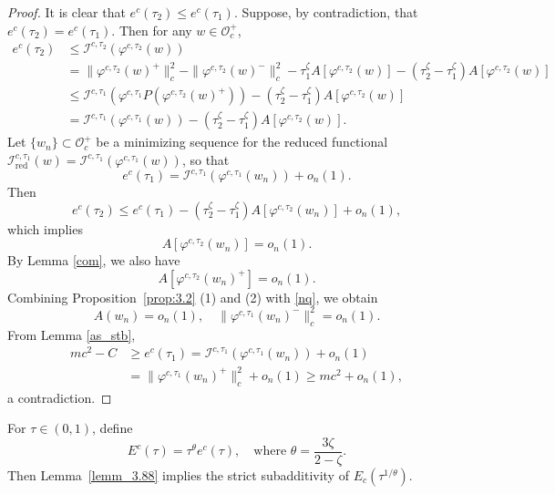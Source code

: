 \documentclass{amsart}
\theoremstyle{plain}
\theoremstyle{definition}
\theoremstyle{remark}
\numberwithin{equation}{section} \numberwithin{figure}{section}
\begin{document}
\begin{proof}
It is clear that $e^c(\tau_2) \leq e^c(\tau_1)$. Suppose, by contradiction, that $e^c(\tau_2) = e^c(\tau_1)$. Then for any $w \in \mathcal{O}_c^+$,
\begin{equation*}
  \begin{split}
    e^c(\tau_2) &\leq \mathcal{I}^{c, \tau_2}(\varphi^{c,\tau_2}(w)) \\
    &= \| \varphi^{c,\tau_2}(w)^+\|_c^2 - \| \varphi^{c,\tau_2}(w)^-\|_c^2 - \tau_1^{\zeta} A[\varphi^{c,\tau_2}(w)] - (\tau_2^{\zeta} - \tau_1^{\zeta}) A[\varphi^{c,\tau_2}(w)] \\
    &\leq \mathcal{I}^{c, \tau_1}\left(\varphi^{c, \tau_1}P(\varphi^{c,\tau_2}(w)^+)
\right) - (\tau_2^{\zeta} - \tau_1^{\zeta}) A[\varphi^{c,\tau_2}(w)] \\
    &= \mathcal{I}^{c, \tau_1}(\varphi^{c, \tau_1}(w)) - (\tau_2^{\zeta} - \tau_1^{\zeta}) A[\varphi^{c,\tau_2}(w)].
  \end{split}
\end{equation*}
Let $\{w_n\} \subset \mathcal{O}_{c}^+$ be a minimizing sequence for the reduced functional $\mathcal{I}_{\mathrm{red}}^{c,\tau_1}(w) = \mathcal{I}^{c, \tau_1}(\varphi^{c, \tau_1}(w))$, so that
\[
e^c(\tau_1) = \mathcal{I}^{c, \tau_1}(\varphi^{c, \tau_1}(w_n)) + o_n(1).
\]
Then
\[
e^c(\tau_2) \leq e^c(\tau_1) - (\tau_2^{\zeta} - \tau_1^{\zeta}) A[\varphi^{c,\tau_2}(w_n)] + o_n(1),
\]
which implies
\[
A[\varphi^{c,\tau_2}(w_n)] = o_n(1).
\]
By Lemma \ref{com}, we also have
\begin{equation}\label{nq}
    A[\varphi^{c,\tau_2}(w_n)^+] = o_n(1).
\end{equation}
Combining Proposition~\ref{prop:3.2} (1) and (2) with \eqref{nq}, we obtain
\[
A(w_n) = o_n(1), \quad \|\varphi^{c,\tau_1}(w_n)^-\|_{c}^2 = o_n(1).
\]
From Lemma \ref{as_stb},
\begin{equation*}
  \begin{split}
    m c^2 - C &\geq e^c(\tau_1) = \mathcal{I}^{c, \tau_1}(\varphi^{c, \tau_1}(w_n)) + o_n(1) \\
    &= \|\varphi^{c, \tau_1}(w_n)^+\|_c^2 + o_n(1) \geq m c^2 + o_n(1),
  \end{split}
\end{equation*}
a contradiction.
\end{proof}

For $\tau \in (0,1)$, define
\[
E^c(\tau) = \tau^{\theta} e^c(\tau), \quad \text{where } \theta = \frac{3\zeta}{2 - \zeta}.
\]
Then Lemma~\ref{lemm_3.88} implies the strict subadditivity of $E_c(\tau^{1/\theta})$.
\end{document}
